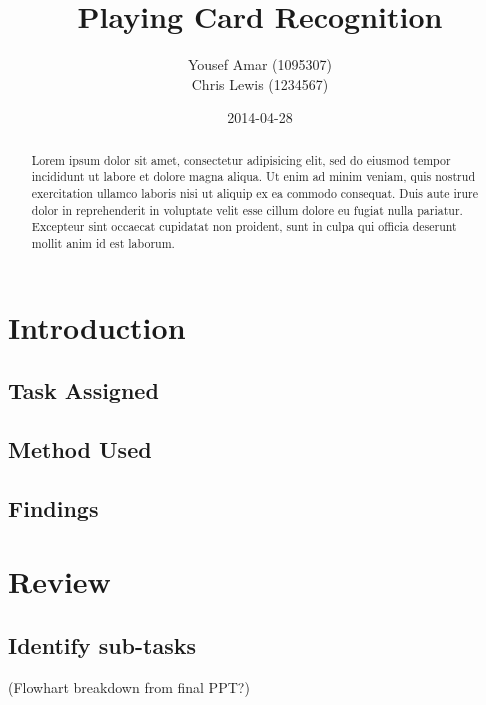 \documentclass[a4paper,12pt,notitlepage]{article}
\begin{document}
\parskip 2mm

\title{{\huge Playing Card Recognition}\\}
\author{Yousef Amar (1095307)\\Chris Lewis (1234567)}
\date{2014-04-28}
\maketitle
\thispagestyle{empty}
\vfill
\begin{abstract}
	Lorem ipsum dolor sit amet, consectetur adipisicing elit, sed do eiusmod tempor incididunt ut labore et dolore magna aliqua. Ut enim ad minim veniam, quis nostrud exercitation ullamco laboris nisi ut aliquip ex ea commodo consequat. Duis aute irure dolor in reprehenderit in voluptate velit esse cillum dolore eu fugiat nulla pariatur. Excepteur sint occaecat cupidatat non proident, sunt in culpa qui officia deserunt mollit anim id est laborum.
\end{abstract}
\pagebreak

\tableofcontents
\thispagestyle{empty}
\pagebreak
\setcounter{page}{1}

\parskip 2mm

\section{Introduction}
	\subsection{Task Assigned}
	\subsection{Method Used}
	\subsection{Findings}
\pagebreak
\section{Review}
	\subsection{Identify sub-tasks}
		(Flowhart breakdown from final PPT?)
\end{document}
